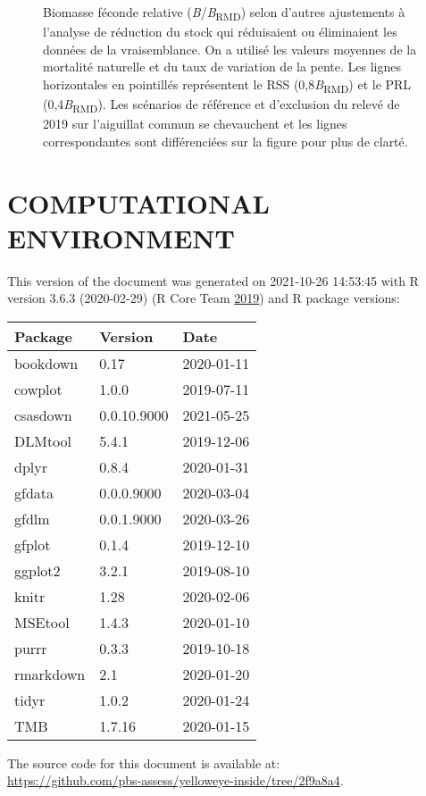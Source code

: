 \documentclass[11pt]{book}
\begin{document}
\begin{figure}[htb]

{\centering {} 

}

\caption{Biomasse féconde relative (\emph{B}/\emph{B}\textsubscript{RMD}) selon d'autres ajustements à l'analyse de réduction du stock qui réduisaient ou éliminaient les données de la vraisemblance. On a utilisé les valeurs moyennes de la mortalité naturelle et du taux de variation de la pente. Les lignes horizontales en pointillés représentent le RSS (0,8\emph{B}\textsubscript{RMD}) et le PRL (0,4\emph{B}\textsubscript{RMD}). Les scénarios de référence et d'exclusion du relevé de 2019 sur l'aiguillat commun se chevauchent et les lignes correspondantes sont différenciées sur la figure pour plus de clarté.}\label{fig:alt-SRA-fit}
\end{figure}
\clearpage

\hypertarget{computational-environment}{%
\section{COMPUTATIONAL ENVIRONMENT}\label{computational-environment}}

This version of the document was generated on 2021-10-26 14:53:45 with R version 3.6.3 (2020-02-29) (R Core Team \protect\hyperlink{ref-r2019}{2019}) and R package versions:
\begin{longtable}[]{@{}lll@{}}
\toprule
Package & Version & Date\tabularnewline
\midrule
\endhead
bookdown & 0.17 & 2020-01-11\tabularnewline
cowplot & 1.0.0 & 2019-07-11\tabularnewline
csasdown & 0.0.10.9000 & 2021-05-25\tabularnewline
DLMtool & 5.4.1 & 2019-12-06\tabularnewline
dplyr & 0.8.4 & 2020-01-31\tabularnewline
gfdata & 0.0.0.9000 & 2020-03-04\tabularnewline
gfdlm & 0.0.1.9000 & 2020-03-26\tabularnewline
gfplot & 0.1.4 & 2019-12-10\tabularnewline
ggplot2 & 3.2.1 & 2019-08-10\tabularnewline
knitr & 1.28 & 2020-02-06\tabularnewline
MSEtool & 1.4.3 & 2020-01-10\tabularnewline
purrr & 0.3.3 & 2019-10-18\tabularnewline
rmarkdown & 2.1 & 2020-01-20\tabularnewline
tidyr & 1.0.2 & 2020-01-24\tabularnewline
TMB & 1.7.16 & 2020-01-15\tabularnewline
\bottomrule
\end{longtable}
The source code for this document is available at:\\
\url{https://github.com/pbs-assess/yelloweye-inside/tree/2f9a8a4}.
\end{document}
